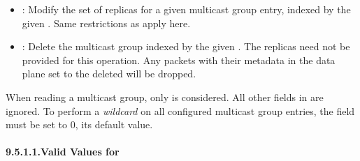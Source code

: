 \documentclass[11pt]{article}
\begin{document}
{\begin{itemize}[noitemsep,topsep=\mdcompacttopsep]
\item{}: Modify the set of replicas for a given multicast group entry,
indexed by the given . Same restrictions as  apply
here.%

\item{}: Delete the multicast group indexed by the given
. The replicas need not be provided for this
operation. Any packets with their  metadata in the data plane
set to the deleted  will be dropped.%
\end{itemize}%

\noindent{}When reading a multicast group, only  is considered. All
other fields in  are ignored. To perform a \emph{wildcard}
 on all configured multicast group entries, the  field
must be set to 0, its default value.%

\paragraph{9.5.1.1.\hspace*{0.5em}Valid Values for }\label{sec-valid-values-for-mg-id}%

}
\end{document}
